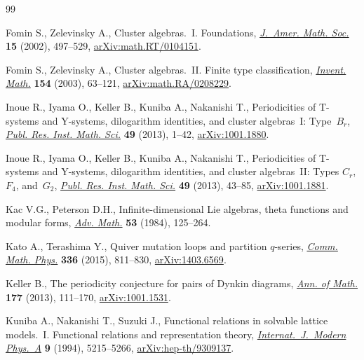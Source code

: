 \documentclass[10pt,a4paper]{amsart}
\numberwithin{equation}{section}
\begin{document}
\begin{thebibliography}{99}
\footnotesize\itemsep=0pt

Fomin S., Zelevinsky A., Cluster algebras.~{I}. {F}oundations, \href{https://doi.org/10.1090/S0894-0347-01-00385-X}{\textit{J.~Amer.
 Math. Soc.}} \textbf{15} (2002), 497--529, \href{https://arxiv.org/abs/math.RT/0104151}{arXiv:math.RT/0104151}.

Fomin S., Zelevinsky A., Cluster algebras.~{II}. {F}inite type classification,
 \href{https://doi.org/10.1007/s00222-003-0302-y}{\textit{Invent. Math.}} \textbf{154} (2003), 63--121,
 \href{https://arxiv.org/abs/math.RA/0208229}{arXiv:math.RA/0208229}.

Inoue R., Iyama O., Keller B., Kuniba A., Nakanishi T., Periodicities of
 {T}-systems and {Y}-systems, dilogarithm identities, and cluster
 algebras~{I}: {T}ype~{$B_r$}, \href{https://doi.org/10.4171/PRIMS/95}{\textit{Publ. Res. Inst. Math. Sci.}}
 \textbf{49} (2013), 1--42, \href{https://arxiv.org/abs/1001.1880}{arXiv:1001.1880}.

Inoue R., Iyama O., Keller B., Kuniba A., Nakanishi T., Periodicities of
 {T}-systems and {Y}-systems, dilogarithm identities, and cluster
 algebras~{II}: {T}ypes {$C_r$}, {$F_4$}, and~{$G_2$}, \href{https://doi.org/10.4171/PRIMS/96}{\textit{Publ. Res.
 Inst. Math. Sci.}} \textbf{49} (2013), 43--85, \href{https://arxiv.org/abs/1001.1881}{arXiv:1001.1881}.

Kac V.G., Peterson D.H., Infinite-dimensional {L}ie algebras, theta functions
 and modular forms, \href{https://doi.org/10.1016/0001-8708(84)90032-X}{\textit{Adv. Math.}} \textbf{53} (1984), 125--264.

Kato A., Terashima Y., Quiver mutation loops and partition {$q$}-series,
 \href{https://doi.org/10.1007/s00220-014-2224-5}{\textit{Comm. Math. Phys.}} \textbf{336} (2015), 811--830, \href{https://arxiv.org/abs/1403.6569}{arXiv:1403.6569}.

Keller B., The periodicity conjecture for pairs of {D}ynkin diagrams,
 \href{https://doi.org/10.4007/annals.2013.177.1.3}{\textit{Ann. of Math.}} \textbf{177} (2013), 111--170, \href{https://arxiv.org/abs/1001.1531}{arXiv:1001.1531}.

Kuniba A., Nakanishi T., Suzuki J., Functional relations in solvable lattice
 models.~{I}. {F}unctional relations and representation theory,
 \href{https://doi.org/10.1142/S0217751X94002119}{\textit{Internat.~J.~Modern Phys.~A}} \textbf{9} (1994), 5215--5266,
 \href{https://arxiv.org/abs/hep-th/9309137}{arXiv:hep-th/9309137}.


\end{thebibliography}
\end{document}
